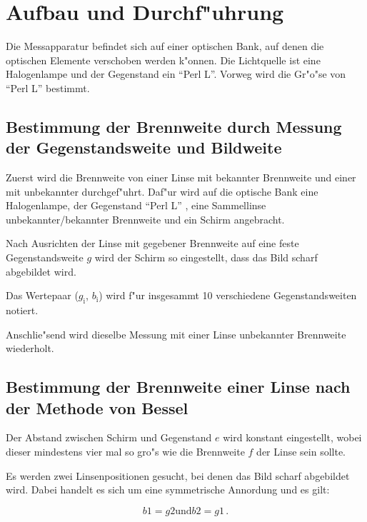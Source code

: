 \section{Aufbau und Durchf"uhrung}
	\label{sec:durchfuehrung}

	Die Messapparatur befindet sich auf einer optischen Bank, auf denen die optischen Elemente verschoben werden k"onnen.
	Die Lichtquelle ist eine Halogenlampe und der Gegenstand ein "`Perl L"'.
	Vorweg wird die Gr"o"se von "`Perl L"' bestimmt.

	\subsection{Bestimmung der Brennweite durch Messung der Gegenstandsweite und Bildweite} %
		\label{sub:bestimmung_der_brennweite_durch_messung_der_gegenstandsweite_und_bildweite}
		
		Zuerst wird die Brennweite von einer Linse mit bekannter Brennweite und einer mit unbekannter durchgef"uhrt.
		Daf"ur wird auf die optische Bank eine Halogenlampe, der Gegenstand "`Perl L"' , eine Sammellinse unbekannter/bekannter Brennweite und ein Schirm angebracht.

		Nach Ausrichten der Linse mit gegebener Brennweite auf eine feste Gegenstandsweite $g$ wird der Schirm so eingestellt, dass das Bild scharf abgebildet wird.

		Das Wertepaar ($g_\mathrm{i}$, $b_\mathrm{i}$) wird f"ur insgesammt 10 verschiedene Gegenstandsweiten notiert.

		Anschlie"send wird dieselbe Messung mit einer Linse unbekannter Brennweite wiederholt.

	\subsection{Bestimmung der Brennweite einer Linse nach der Methode von Bessel} %
		\label{sub:bestimmung_der_brennweite_einer_linse_nach_der_methode_von_bessel}
		
		Der Abstand zwischen Schirm und Gegenstand $e$ wird konstant eingestellt, wobei dieser mindestens vier mal so gro"s wie die Brennweite $f$ der Linse sein sollte.

		Es werden zwei Linsenpositionen gesucht, bei denen das Bild scharf abgebildet wird. Dabei handelt es sich um eine symmetrische Annordung und es gilt:

		\begin{equation}
			b1 = g2 \text{und} b2 = g1\, . \nonumber
		\end{equation}

